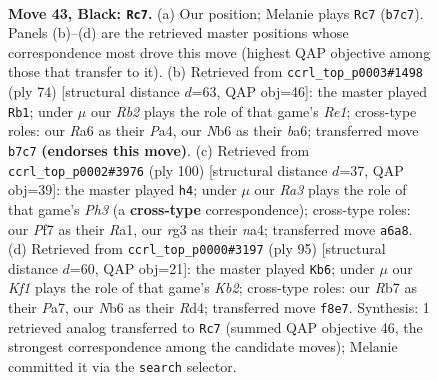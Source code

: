 \documentclass[11pt]{article}
\begin{document}
\clearpage

\begin{figure}[p]\centering
\begin{subfigure}{0.46\textwidth}\centering
\resizebox{\linewidth}{!}{%
\newchessgame
\chessboard[
  setfen={5k2/1r3p1p/rn4p1/p3p1P1/P3P3/1P4RP/3K2P1/RN6 b - - 1 43},
  showmover=false,
  pgfstyle=straightmove, color=movearrow, markmove={b7-c7}
]}
\caption{}
\end{subfigure}\hfill
\begin{subfigure}{0.46\textwidth}\centering
\resizebox{\linewidth}{!}{%
\newchessgame
\chessboard[
  setfen={1r1r1k2/4pp2/bp1p2p1/3N3p/P1P1P2P/1K3P2/2R3P1/4R3 w - - 2 38},
  showmover=false,
  pgfstyle=straightmove, color=movearrow, markmove={e1-b1}
]}
\caption{}
\end{subfigure}
\\[4pt]
\begin{subfigure}{0.46\textwidth}\centering
\resizebox{\linewidth}{!}{%
\newchessgame
\chessboard[
  setfen={6k1/r5p1/r4p1p/2p5/n1PpPPN1/PR1P3P/8/R5K1 w - - 1 51},
  showmover=false,
  pgfstyle=straightmove, color=movearrow, markmove={h3-h4}
]}
\caption{}
\end{subfigure}\hfill
\begin{subfigure}{0.46\textwidth}\centering
\resizebox{\linewidth}{!}{%
\newchessgame
\chessboard[
  setfen={8/pk6/3r1pp1/4p2p/1P1rP2P/P3R1P1/8/K5R1 b - - 6 48},
  showmover=false,
  pgfstyle=straightmove, color=movearrow, markmove={b7-b6}
]}
\caption{}
\end{subfigure}
\caption{\textbf{Move 43, Black: \texttt{Rc7}.} (a) Our position; Melanie plays \texttt{Rc7} (\texttt{b7c7}). Panels (b)--(d) are the retrieved master positions whose correspondence most drove this move (highest QAP objective among those that transfer to it). (b) Retrieved from \texttt{ccrl\_top\_p0003\#1498} (ply 74) [structural distance $d$=63, QAP obj=46]: the master played \texttt{Rb1}; under $\mu$ our \emph{Rb2} plays the role of that game's \emph{Re1}; cross-type roles: our \emph{R}a6 as their \emph{P}a4, our \emph{N}b6 as their \emph{b}a6; transferred move \texttt{b7c7} \textbf{(endorses this move)}. (c) Retrieved from \texttt{ccrl\_top\_p0002\#3976} (ply 100) [structural distance $d$=37, QAP obj=39]: the master played \texttt{h4}; under $\mu$ our \emph{Ra3} plays the role of that game's \emph{Ph3} (a \textbf{cross-type} correspondence); cross-type roles: our \emph{P}f7 as their \emph{R}a1, our \emph{r}g3 as their \emph{n}a4; transferred move \texttt{a6a8}. (d) Retrieved from \texttt{ccrl\_top\_p0000\#3197} (ply 95) [structural distance $d$=60, QAP obj=21]: the master played \texttt{Kb6}; under $\mu$ our \emph{Kf1} plays the role of that game's \emph{Kb2}; cross-type roles: our \emph{R}b7 as their \emph{P}a7, our \emph{N}b6 as their \emph{R}d4; transferred move \texttt{f8e7}. Synthesis: 1 retrieved analog transferred to \texttt{Rc7} (summed QAP objective 46, the strongest correspondence among the candidate moves); Melanie committed it via the \texttt{search} selector.}
\label{fig:thought-m85}
\end{figure}
\end{document}
